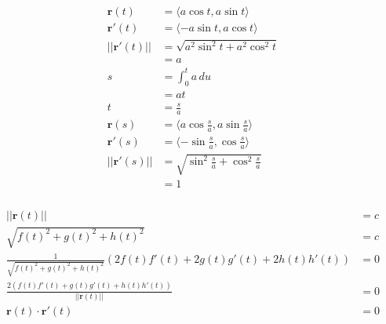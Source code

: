 \documentclass{article}
\begin{document}
\setcounter{subsubsection}{44}
\subsubsection{}

\begin{align*}
  \mathbf{r}(t)      & = \langle a \cos t, a \sin t \rangle                     \\
  \mathbf{r}'(t)     & = \langle -a \sin t, a \cos t \rangle                    \\
  ||\mathbf{r}'(t)|| & = \sqrt{a^2 \sin^2 t + a^2 \cos^2 t}                     \\
                     & = a                                                      \\
  s                  & = \int_0^t a \,du                                        \\
                     & = a t                                                    \\
  t                  & = \frac{s}{a}                                            \\
  \mathbf{r}(s)      & = \langle a \cos \frac{s}{a}, a \sin \frac{s}{a} \rangle \\
  \mathbf{r}'(s)     & = \langle -\sin \frac{s}{a}, \cos \frac{s}{a} \rangle    \\
  ||\mathbf{r}'(s)|| & = \sqrt{\sin^2 \frac{s}{a} + \cos^2 \frac{s}{a}}         \\
                     & = 1
\end{align*}

\setcounter{subsubsection}{46}
\subsubsection{}

\begin{align*}
  ||\mathbf{r}(t)||                                                                      & = c \\
  \sqrt{f(t)^2 + g(t)^2 + h(t)^2}                                                        & = c \\
  \frac{1}{\sqrt{f(t)^2 + g(t)^2 + h(t)^2}} (2 f(t) f'(t) + 2 g(t) g'(t) + 2 h(t) h'(t)) & = 0 \\
  \frac{2 (f(t) f'(t) + g(t) g'(t) + h(t) h'(t))}{||\mathbf{r}(t)||}                     & = 0 \\
  \mathbf{r}(t) \cdot \mathbf{r}'(t)                                                     & = 0
\end{align*}
\end{document}

